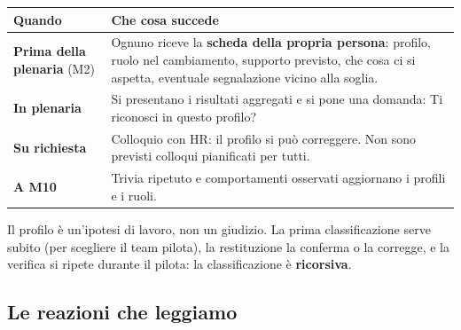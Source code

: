 \documentclass[11pt,a4paper]{article}
\begin{document}
{\small\renewcommand{\arraystretch}{1.25}
\begin{xltabular}{\linewidth}{@{}>{\raggedright\arraybackslash{}\hsize\hspace{0pt}}X>{\raggedright\arraybackslash{}\hsize\hspace{0pt}}X@{}}
\toprule
\textbf{Quando} & \textbf{Che cosa succede} \\
\midrule
\endhead
\textbf{Prima della plenaria} (M2) & Ognuno riceve la \textbf{scheda della propria persona}: profilo, ruolo nel cambiamento, supporto previsto, che cosa ci si aspetta, eventuale segnalazione \guillemotleft{}vicino alla soglia\guillemotright{}. \\
\textbf{In plenaria} & Si presentano i risultati aggregati e si pone una domanda: \guillemotleft{}Ti riconosci in questo profilo?\guillemotright{} \\
\textbf{Su richiesta} & Colloquio con HR: il profilo si può correggere. Non sono previsti colloqui pianificati per tutti. \\
\textbf{A M10} & Trivia ripetuto e comportamenti osservati aggiornano i profili e i ruoli. \\
\bottomrule
\end{xltabular}}

Il profilo è un'ipotesi di lavoro, non un giudizio. La prima classificazione serve subito (per scegliere il team pilota), la restituzione la conferma o la corregge, e la verifica si ripete durante il pilota: la classificazione è \textbf{ricorsiva}.

\subsection{Le reazioni che leggiamo}\label{sec:7.2}
\end{document}
